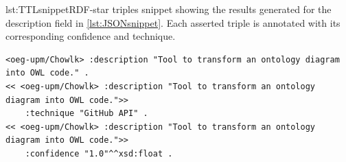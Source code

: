\begin{captionedlisting}{lst:TTLsnippet}{RDF-star triples snippet showing the results generated for the description field in \cref{lst:JSONsnippet}. Each asserted triple is annotated with its corresponding confidence and technique.}
\centering
{
\begin{lstlisting}[basicstyle=\ttfamily\small,label={list:example1},columns=flexible]
<oeg-upm/Chowlk> :description "Tool to transform an ontology diagram into OWL code." .
<< <oeg-upm/Chowlk> :description "Tool to transform an ontology diagram into OWL code.">> 
    :technique "GitHub API" .
<< <oeg-upm/Chowlk> :description "Tool to transform an ontology diagram into OWL code.">> 
    :confidence "1.0"^^xsd:float .
\end{lstlisting}
}
\end{captionedlisting}




